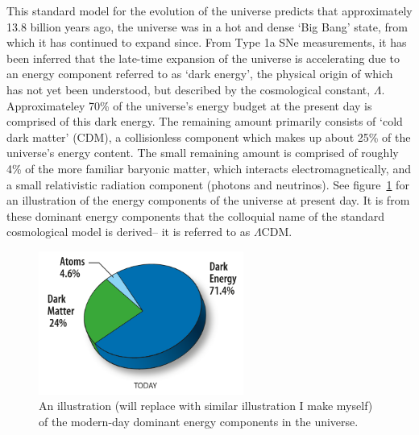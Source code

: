 This standard model for the evolution of the universe predicts that approximately 13.8 billion years ago, the universe was in a hot and dense `Big Bang' state, from which it has continued to expand since. From Type 1a SNe measurements, it has been inferred that the late-time expansion of the universe is accelerating due to an energy component referred to as `dark energy', the physical origin of which has not yet been understood, but described by the cosmological constant, $\Lambda$. Approximateley 70\% of the universe's energy budget at the present day is comprised of this dark energy. The remaining amount primarily consists of `cold dark matter' (CDM), a collisionless component which makes up about 25\% of the universe's energy content. The small remaining amount is comprised of roughly 4\% of the more familiar baryonic matter, which interacts electromagnetically, and a small relativistic radiation component (photons and neutrinos). See figure~\ref{fig:contentuniverse} for an illustration of the energy components of the universe at present day. It is from these dominant energy components that the colloquial name of the standard cosmological model is derived-- it is referred to as $\Lambda$CDM.
\begin{figure}[ht]
	\centering
	\includegraphics[width=0.6\textwidth]{fig/placeholer_energycontent_wmap.png}
	\caption{An illustration (will replace with similar illustration I make myself) of the modern-day dominant energy components in the universe.}
	\label{fig:contentuniverse}
\end{figure}

